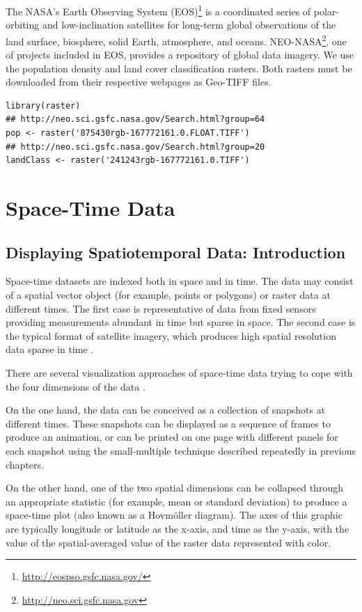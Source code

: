 \documentclass[smallroyalvopaper]{memoir}
\begin{document}
The NASA's Earth Observing System (EOS)\footnote{\url{http://eospso.gsfc.nasa.gov/}} is a coordinated
series of polar-orbiting and low-inclination satellites for
long-term global observations of the land surface, biosphere, solid
Earth, atmosphere, and oceans. NEO-NASA\footnote{\url{http://neo.sci.gsfc.nasa.gov}}, one of projects
included in EOS, provides a repository of global data imagery. We
use the population density and land cover classification
rasters. Both rasters must be downloaded from their respective
webpages as Geo-TIFF files.

\lstset{language=R,numbers=none}
\begin{lstlisting}
library(raster)
## http://neo.sci.gsfc.nasa.gov/Search.html?group=64
pop <- raster('875430rgb-167772161.0.FLOAT.TIFF')
## http://neo.sci.gsfc.nasa.gov/Search.html?group=20
landClass <- raster('241243rgb-167772161.0.TIFF')
\end{lstlisting}
\part{Space-Time Data}
\label{sec:orgheadline46}

\chapter{Displaying Spatiotemporal Data: Introduction}
\label{sec:orgheadline43}
\label{cha:introductionST}

Space-time datasets are indexed both in space and in time. The data may consist of a spatial vector object (for example, points or polygons) or raster data at different times. The first case is representative of data from fixed sensors providing measurements abundant in time but sparse in space. The second case is the typical format of satellite imagery, which produces high spatial resolution data sparse in time \cite{Pebesma2012}.

There are several visualization approaches of space-time data trying to cope with the four dimensions of the data \cite{Cressie.Wikle2011}.

On the one hand, the data can be conceived as a collection of snapshots at different times. These snapshots can be displayed as a sequence of frames to produce an animation, or can be printed on one page with different panels for each snapshot using the small-multiple technique described repeatedly in previous chapters.

On the other hand, one of the two spatial dimensions can be collapsed through an appropriate statistic (for example, mean or standard deviation) to produce a space-time plot (also known as a Hovmöller diagram). The axes of this graphic are typically longitude or latitude as the x-axis, and time as the y-axis, with the value of the spatial-averaged value of the raster data represented with color.
\end{document}
